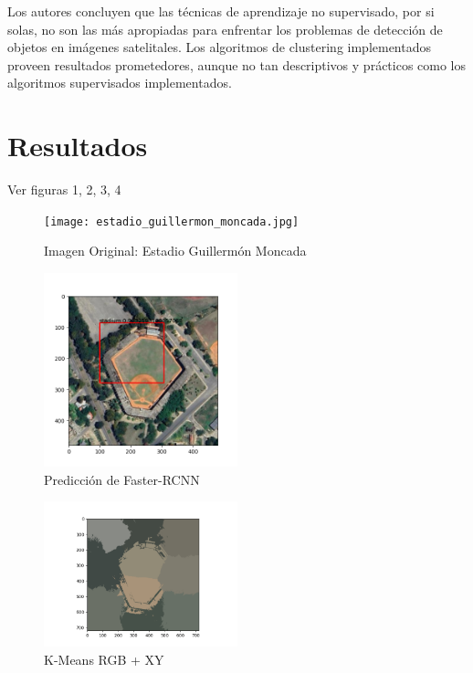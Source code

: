 \documentclass[article]{llncs}
\begin{document}
Los autores concluyen que las t\'ecnicas de aprendizaje no supervisado, por si solas, no son las m\'as apropiadas 
para enfrentar los problemas de detección de objetos en im\'agenes satelitales. Los algoritmos de clustering implementados 
proveen resultados prometedores, aunque no tan descriptivos y pr\'acticos como los algoritmos supervisados implementados.

\section{Resultados}

Ver figuras 1, 2, 3, 4

\begin{figure}[h]
  \centering
  \texttt{[image: estadio\_guillermon\_moncada.jpg]}
  \caption{Imagen Original: Estadio Guillerm\'on Moncada}
  \label{fig:estadio_guillermon_moncada}
\end{figure}

\begin{figure}[h]
  \centering
  \includegraphics[width=0.5\textwidth]{Figure_1.png}
  \caption{Predicci\'on de Faster-RCNN}
  \label{fig:Figure_1}
\end{figure}

\begin{figure}[h]
  \centering
  \includegraphics[width=0.5\textwidth]{Figure_2.png}
  \caption{K-Means RGB + XY}
  \label{fig:Figure_2}
\end{figure}
\end{document}
